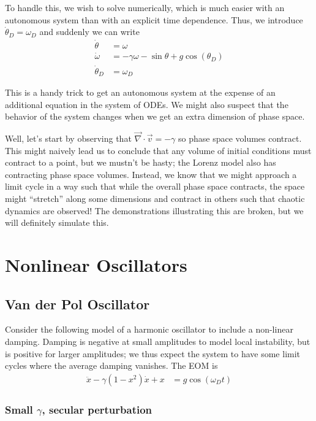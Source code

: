 \documentclass[12pt]{article}
\begin{document}
To handle this, we wish to solve numerically, which is much easier with an
autonomous system than with an explicit time dependence. Thus, we introduce
$\dot{\theta}_D = \omega_D$ and suddenly we can write
\begin{align}
    \dot{\theta} &= \omega \nonumber\\
    \dot{\omega} &= -\gamma \omega - \sin\theta + g\cos(\theta_D) \nonumber\\
    \dot{\theta}_D &= \omega_D
\end{align}

This is a handy trick to get an autonomous system at the expense of an
additional equation in the system of ODEs. We might also suspect that the
behavior of the system changes when we get an extra dimension of phase space.

Well, let's start by observing that $\vec{\nabla} \cdot \vec{v} = -\gamma$ so
phase space volumes contract. This might naively lead us to conclude that any
volume of initial conditions must contract to a point, but we mustn't be hasty;
the Lorenz model also has contracting phase space volumes. Instead, we know
that we might approach a limit cycle in a way such that while the overall phase
space contracts, the space might ``stretch'' along some dimensions and contract
in others such that chaotic dynamics are observed! The demonstrations
illustrating this are broken, but we will definitely simulate this.

\clearpage

\section{Nonlinear Oscillators}

\subsection{Van der Pol Oscillator}

Consider the following model of a harmonic oscillator to include a non-linear
damping. Damping is negative at small amplitudes to model local instability,
but is positive for larger amplitudes; we thus expect the system to have some
limit cycles where the average damping vanishes. The EOM is
\begin{align}
    \ddot{x} - \gamma(1-x^2)\dot{x} + x &= g\cos(\omega_D t)
\end{align}

\subsubsection{Small $\gamma$, secular perturbation}
\end{document}
